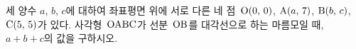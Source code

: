 세 양수 $a$, $b$, $c$에 대하여 좌표평면 위에 서로 다른 네 점~$\mathrm{O}(0,\mkern3mu 0)$, $\mathrm{A}(a,\mkern3mu 7)$, $\mathrm{B}(b,\mkern3mu c)$, $\mathrm{C}(5,\mkern3mu 5)$가 있다. 사각형~$\mathrm{OABC}$가 선분~$\mathrm{OB}$를 대각선으로 하는 마름모일 때, $a+b+c$의 값을 구하시오. 
